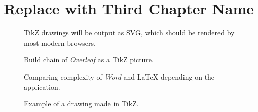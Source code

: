 \chapter{Replace with Third Chapter Name} \label{c3_thirdchapter:cha}

\begin{figure}
    \centering
    \caption{TikZ drawings will be output as SVG, which should be rendered by most modern browsers.}
\end{figure}

\begin{figure}
    \centering
    
    \caption{Build chain of \textit{Overleaf} as a TikZ picture.}
\end{figure}

\begin{figure}
    \centering
    
    \caption{Comparing complexity of \textit{Word} and \LaTeX{} depending on the application.}
\end{figure}

\begin{figure}
    \centering
    

    \caption{Example of a drawing made in TikZ.}
\end{figure}

